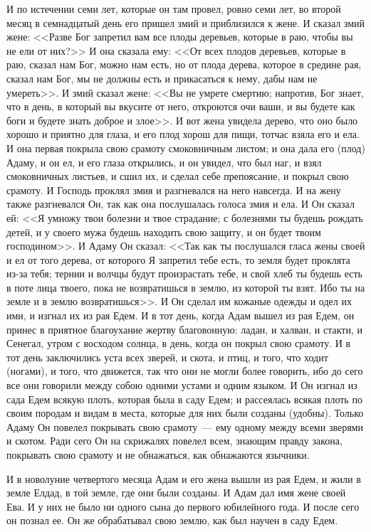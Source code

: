 И по истечении семи лет, которые он там провел, ровно семи лет, во второй
месяц в семнадцатый день его пришел змий и приблизился к жене. И сказал змий
жене: <<Разве Бог запретил вам все плоды деревьев, которые в раю, чтобы вы
не ели от них?>> И она сказала ему: <<От всех плодов деревьев, которые
в раю, сказал нам Бог, можно нам есть, но от плода дерева, которое в средине
рая, сказал нам Бог, мы не должны есть и прикасаться к нему, дабы нам не
умереть>>. И змий сказал жене: <<Вы не умрете смертию; напротив, Бог
знает, что в день, в который вы вкусите от него, откроются очи ваши, и
вы будете как боги и будете знать доброе и злое>>. И вот жена увидела
дерево, что оно было хорошо и приятно для глаза, и его плод хорош для пищи,
тотчас взяла его и ела. И она первая покрыла свою срамоту смоковничным листом;
и она дала его (плод) Адаму, и он ел, и его глаза открылись, и он увидел, что
был наг, и взял смоковничных листьев, и сшил их, и сделал себе препоясание, и
покрыл свою срамоту. И Господь проклял змия и разгневался на него навсегда. И
на жену также разгневался Он, так как она послушалась голоса змия и ела. И Он
сказал ей: <<Я умножу твои болезни и твое страдание; с болезнями ты будешь
рождать детей, и у своего мужа будешь находить свою защиту, и он будет
твоим господином>>. И Адаму Он сказал: <<Так как ты послушался гласа
жены своей и ел от того дерева, от которого Я запретил тебе есть, то земля
будет проклята из-за тебя; тернии и волчцы будут произрастать тебе, и свой хлеб
ты будешь есть в поте лица твоего, пока не возвратишься в землю, из которой ты
взят. Ибо ты на земле и в землю возвратишься>>. И Он сделал им кожаные
одежды и одел их ими, и изгнал их из рая Едем. И в тот день, когда Адам вышел
из рая Едем, он принес в приятное благоухание жертву благовонную: ладан, и
халван, и стакти, и Сенегал, утром с восходом солнца, в день, когда он покрыл
свою срамоту. И в тот день заключились уста всех зверей, и скота, и птиц, и
того, что ходит (ногами), и того, что движется, так что они не могли более
говорить, ибо до сего все они говорили между собою одними устами и одним
языком. И Он изгнал из сада Едем всякую плоть, которая была в саду Едем; и
рассеялась всякая плоть по своим породам и видам в места, которые для них были
созданы (удобны). Только Адаму Он повелел покрывать свою срамоту~--- ему
одному между всеми зверями и скотом. Ради сего Он на скрижалях повелел всем,
знающим правду закона, покрывать свою срамоту и не обнажаться, как обнажаются
язычники.

И в новолуние четвертого месяца Адам и его жена вышли из рая Едем, и жили в
земле Елдад, в той земле, где они были созданы. И Адам дал имя жене своей Ева.
И у них не было ни одного сына до первого юбилейного года. И после сего он
познал ее. Он же обрабатывал свою землю, как был научен в саду Едем.

